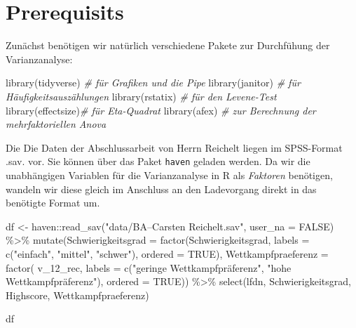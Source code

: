 \documentclass[
]{book}
\newenvironment{Shaded}{\begin{snugshade}}{\end{snugshade}}
\newcommand{\AttributeTok}[1]{\textcolor[rgb]{0.77,0.63,0.00}{#1}}
\newcommand{\CommentTok}[1]{\textcolor[rgb]{0.56,0.35,0.01}{\textit{#1}}}
\newcommand{\ConstantTok}[1]{\textcolor[rgb]{0.00,0.00,0.00}{#1}}
\newcommand{\FunctionTok}[1]{\textcolor[rgb]{0.00,0.00,0.00}{#1}}
\newcommand{\NormalTok}[1]{#1}
\newcommand{\OtherTok}[1]{\textcolor[rgb]{0.56,0.35,0.01}{#1}}
\newcommand{\SpecialCharTok}[1]{\textcolor[rgb]{0.00,0.00,0.00}{#1}}
\newcommand{\StringTok}[1]{\textcolor[rgb]{0.31,0.60,0.02}{#1}}
\begin{document}
\hypertarget{prerequisits}{%
\section{Prerequisits}\label{prerequisits}}

Zunächst benötigen wir natürlich verschiedene Pakete zur Durchfühung der Varianzanalyse:

\begin{Shaded}
\begin{Highlighting}[]
\FunctionTok{library}\NormalTok{(tidyverse) }\CommentTok{\# für Grafiken und die Pipe}
\FunctionTok{library}\NormalTok{(janitor)   }\CommentTok{\# für Häufigkeitsauszählungen}
\FunctionTok{library}\NormalTok{(rstatix)   }\CommentTok{\# für den Levene{-}Test}
\FunctionTok{library}\NormalTok{(effectsize)}\CommentTok{\# für Eta{-}Quadrat}
\FunctionTok{library}\NormalTok{(afex)      }\CommentTok{\# zur Berechnung der mehrfaktoriellen Anova}
\end{Highlighting}
\end{Shaded}

Die Die Daten der Abschlussarbeit von Herrn Reichelt liegen im SPSS-Format .sav. vor. Sie können über das Paket \texttt{haven} geladen werden. Da wir die unabhängigen Variablen für die Varianzanalyse in R als \emph{Faktoren} benötigen, wandeln wir diese gleich im Anschluss an den Ladevorgang direkt in das benötigte Format um.

\begin{Shaded}
\begin{Highlighting}[]
\NormalTok{df }\OtherTok{\textless{}{-}}\NormalTok{ haven}\SpecialCharTok{::}\FunctionTok{read\_sav}\NormalTok{(}\StringTok{"data/BA–Carsten Reichelt.sav"}\NormalTok{, }\AttributeTok{user\_na =} \ConstantTok{FALSE}\NormalTok{) }\SpecialCharTok{\%\textgreater{}\%} 
  \FunctionTok{mutate}\NormalTok{(}\AttributeTok{Schwierigkeitsgrad =} \FunctionTok{factor}\NormalTok{(Schwierigkeitsgrad, }
                                     \AttributeTok{labels =} \FunctionTok{c}\NormalTok{(}\StringTok{"einfach"}\NormalTok{, }\StringTok{"mittel"}\NormalTok{, }\StringTok{"schwer"}\NormalTok{), }
                                     \AttributeTok{ordered =} \ConstantTok{TRUE}\NormalTok{),}
         \AttributeTok{Wettkampfpraeferenz =} \FunctionTok{factor}\NormalTok{( v\_12\_rec,}
                                       \AttributeTok{labels =} \FunctionTok{c}\NormalTok{(}\StringTok{"geringe Wettkampfpräferenz"}\NormalTok{, }\StringTok{"hohe Wettkampfpräferenz"}\NormalTok{),}
                                       \AttributeTok{ordered =} \ConstantTok{TRUE}\NormalTok{)) }\SpecialCharTok{\%\textgreater{}\%} 
  \FunctionTok{select}\NormalTok{(lfdn, Schwierigkeitsgrad, Highscore, Wettkampfpraeferenz)}

\NormalTok{df}
\end{Highlighting}
\end{Shaded}
\end{document}
